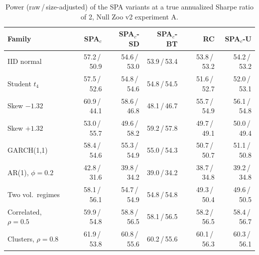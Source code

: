 \begin{table}[t]
\centering
\footnotesize
\setlength{\tabcolsep}{3.5pt}
\caption{Power (raw\,/\,size-adjusted) of the SPA variants at a true annualized Sharpe ratio of 2, Null Zoo v2 experiment A.}
\label{tab:mechanism-power}
\begin{tabular}{lrrrrr}
\toprule
Family & SPA$_c$ & SPA$_c$-SD & SPA$_c$-BT & RC & SPA$_c$-U \\
\midrule
IID normal & 57.2\,/\,50.9 & 54.6\,/\,53.0 & 53.9\,/\,53.4 & 53.8\,/\,53.2 & 54.2\,/\,53.2 \\
Student $t_4$ & 57.5\,/\,52.6 & 54.8\,/\,54.6 & 54.8\,/\,54.5 & 51.6\,/\,52.7 & 52.0\,/\,53.1 \\
Skew $-1.32$ & 60.9\,/\,44.1 & 58.6\,/\,46.8 & 48.1\,/\,46.7 & 55.7\,/\,54.9 & 56.1\,/\,54.8 \\
Skew $+1.32$ & 53.0\,/\,55.7 & 49.6\,/\,58.2 & 59.2\,/\,57.8 & 49.7\,/\,49.1 & 50.0\,/\,49.4 \\
GARCH(1,1) & 58.4\,/\,54.6 & 55.3\,/\,54.9 & 55.0\,/\,54.3 & 50.7\,/\,50.7 & 51.1\,/\,50.8 \\
AR(1), $\phi=0.2$ & 42.8\,/\,31.6 & 39.8\,/\,34.2 & 39.0\,/\,34.2 & 38.7\,/\,34.8 & 39.2\,/\,34.8 \\
Two vol.\ regimes & 58.1\,/\,56.1 & 54.7\,/\,54.9 & 54.8\,/\,54.8 & 49.3\,/\,50.4 & 49.6\,/\,50.5 \\
Correlated, $\rho=0.5$ & 59.9\,/\,54.8 & 58.8\,/\,56.5 & 58.1\,/\,56.5 & 58.2\,/\,56.5 & 58.4\,/\,56.7 \\
Clusters, $\rho=0.8$ & 61.9\,/\,53.8 & 60.8\,/\,55.6 & 60.2\,/\,55.6 & 60.1\,/\,56.3 & 60.3\,/\,56.1 \\
\bottomrule
\end{tabular}
\end{table}

